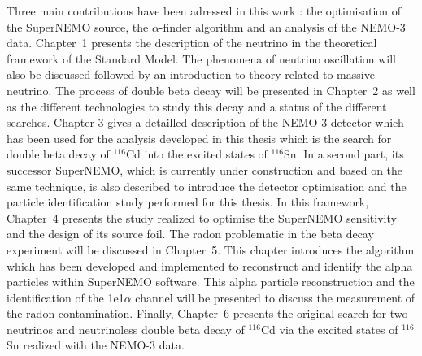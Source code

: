 \documentclass[main.tex]{subfiles}
\begin{document}
\bigskip

\NI Three main contributions have been adressed in this work : the optimisation of the SuperNEMO source, the $\alpha$-finder algorithm and an analysis of the NEMO-3 data. Chapter~1 presents the description of the neutrino in the theoretical framework of the Standard Model. The phenomena of neutrino oscillation will also be discussed followed by an introduction to theory related to massive neutrino. \NI The process of double beta decay will be presented in Chapter~2 as well as the different technologies to study this decay and a status of the different searches. Chapter 3 gives a detailled description of the NEMO-3 detector which has been used for the analysis developed in this thesis which is the search for double beta decay of $^{\text{116}}$Cd into the excited states of $^{\text{116}}$Sn. In a second part, its successor SuperNEMO, which is currently under construction and based on the same technique, is also described to introduce the detector optimisation and the particle identification study performed for this thesis. In this framework, Chapter~4 presents the study realized to optimise the SuperNEMO sensitivity and the design of its source foil. The radon problematic in the beta decay experiment will be discussed in Chapter~5. This chapter introduces the algorithm which has been developed and implemented to reconstruct and identify the alpha particles within SuperNEMO software. This alpha particle reconstruction and the identification of the 1e1$\alpha$ channel will be presented to discuss the measurement of the radon contamination. Finally, Chapter~6 presents the original search for two neutrinos and neutrinoless double beta decay of $^{\text{116}}$Cd via the excited states of $^{\text{116}}$Sn realized with the NEMO-3 data.
\end{document}

